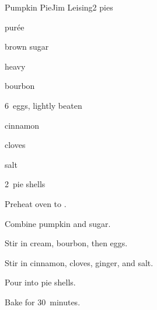 \begin{recipe}{Pumpkin Pie}{Jim Leising}{2 pies}

\begin{ingredients}
\item \C{1\threequarter}  pur\'ee
\item {} brown sugar
\item \C{1\half} heavy 
\item \C{\half} bourbon
\item 6~eggs, lightly beaten
\item {} cinnamon
\item \tp{\half} cloves
\item \tp{1\half} 
\item \tp{\quarter} salt
\item 2~pie shells
\end{ingredients}

\begin{directions}
\item Preheat oven to .
\item Combine pumpkin and sugar.
\item Stir in cream, bourbon, then eggs.
\item Stir in cinnamon, cloves, ginger, and salt.
\item Pour into pie shells.
\item Bake for 30~minutes.
\end{directions}

\end{recipe}
